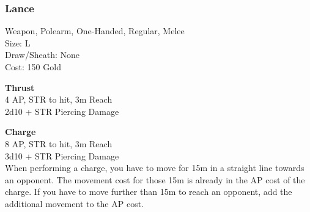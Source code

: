 \subsubsection{Lance}\label{weapon:lance}
Weapon, Polearm, One-Handed, Regular, Melee\\
Size: L\\
Draw/Sheath: None\\
Cost: 150 Gold

\textbf{Thrust}\\
4 AP, STR to hit, 3m Reach\\
2d10 + \texttimes STR Piercing Damage

\textbf{Charge}\\
8 AP, STR to hit, 3m Reach\\
3d10 + \texttimes STR Piercing Damage\\
When performing a charge, you have to move for 15m in a straight line towards an opponent.
The movement cost for those 15m is already in the AP cost of the charge.
If you have to move further than 15m to reach an opponent, add the additional movement to the AP cost.